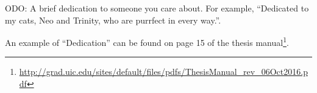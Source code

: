 \dedication

TODO: A brief dedication to someone you care about.  For example, ``Dedicated to
my cats, Neo and Trinity, who are purrfect in every way.''.

An example of ``Dedication'' can be found on page 15 of the thesis
manual\footnote{\url{http://grad.uic.edu/sites/default/files/pdfs/ThesisManual_rev_06Oct2016.pdf}}.